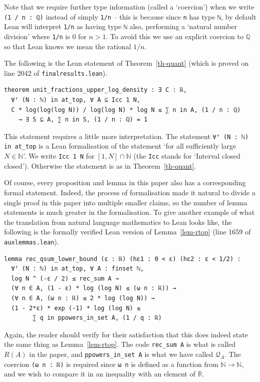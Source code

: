 \documentclass[12pt]{amsart}
\begin{document}
Note that we require further type information (called a `coercion') when we write \lstinline{(1 / n : ℚ)} instead of simply \lstinline{1/n} -- this is because since \lstinline{n} has type \lstinline{ℕ}, by default Lean will interpret \lstinline{1/n} as having type \lstinline{ℕ} also, performing a `natural number division' where \lstinline{1/n} is 0 for $n > 1$. To avoid this we use an explicit coercion to $\mathbb{Q}$ so that Lean knows we mean the rational $1/n$. 

The following is the Lean statement of Theorem~\ref{th-quant} (which is proved on line 2042 of \texttt{final\textunderscore results.lean}). 
\begin{lstlisting}
theorem unit_fractions_upper_log_density : ∃ C : ℝ,
  ∀ᶠ (N : ℕ) in at_top, ∀ A ⊆ Icc 1 N,
  C * log(log(log N)) / log(log N) * log N ≤ ∑ n in A, (1 / n : ℚ) 
    → ∃ S ⊆ A, ∑ n in S, (1 / n : ℚ) = 1
\end{lstlisting}
This statement requires a little more interpretation. The statement \lstinline{∀ᶠ (N : ℕ) in at_top} is a Lean formalisation of the statement `for all sufficiently large $N\in\mathbb{N}$'. We write \lstinline{Icc 1 N} for $[1,N]\cap \mathbb{N}$ (the \lstinline{Icc} stands for `Interval closed closed'). Otherwise the statement is as in Theorem~\ref{th-quant}. 

Of course, every proposition and lemma in this paper also has a corresponding formal statement. Indeed, the process of formalisation made it natural to divide a single proof in this paper into multiple smaller claims, so the number of lemma statements is much greater in the formalisation. To give another example of what the translation from natural language mathematics to Lean looks like, the following is the formally verified Lean version of Lemma~\ref{lem-rtop} (line 1659 of \texttt{aux\textunderscore lemmas.lean}).

\begin{lstlisting}
lemma rec_qsum_lower_bound (ε : ℝ) (hε1 : 0 < ε) (hε2 : ε < 1/2) :
  ∀ᶠ (N : ℕ) in at_top, ∀ A : finset ℕ,
  log N ^ (-ε / 2) ≤ rec_sum A → 
  (∀ n ∈ A, (1 - ε) * log (log N) ≤ (ω n : ℝ)) → 
  (∀ n ∈ A, (ω n : ℝ) ≤ 2 * log (log N)) → 
  (1 - 2*ε) * exp (-1) * log (log N) ≤ 
        ∑ q in ppowers_in_set A, (1 / q : ℝ)
\end{lstlisting}

Again, the reader should verify for their satisfaction that this does indeed state the same thing as Lemma~\ref{lem-rtop}. The code \lstinline{rec_sum A} is what is called $R(A)$ in the paper, and \lstinline{ppowers_in_set A} is what we have called $\mathcal{Q}_A$. The coercion \lstinline{(ω n : ℝ)} is required since \lstinline{ω n} is defined as a function from $\mathbb{N}\to\mathbb{N}$, and we wish to compare it in an inequality with an element of $\mathbb{R}$.
\end{document}
